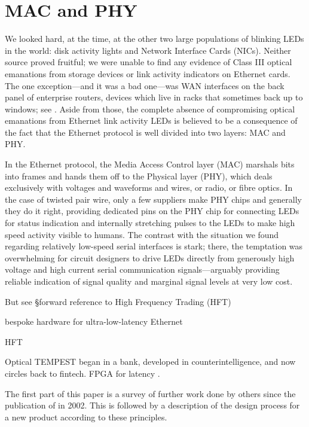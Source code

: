 \documentclass[conference]{IEEEtran}
\begin{document}
\section{MAC and PHY}

We looked hard, at the time, at the other two large populations of blinking
LEDs in the world: disk activity lights and Network Interface Cards (NICs).
Neither source proved fruitful; we were unable to find any evidence of Class
III optical emanations from storage devices or link activity indicators on
Ethernet cards. The one exception---and it was a bad one---was WAN interfaces
on the back panel of enterprise routers, devices which live in racks that
sometimes back up to windows; see \cite[\S 4.3.1]{Loughry2002a}. Aside from
those, the complete absence of compromising optical emanations from Ethernet
link activity LEDs is believed to be a consequence of the fact that the
Ethernet protocol is well divided into two layers: MAC and PHY.

In the Ethernet protocol, the Media Access Control layer (MAC) marshals bits
into frames and hands them off to the Physical layer (PHY), which deals
exclusively with voltages and waveforms and wires, or radio, or fibre optics.
In the case of twisted pair wire, only a few suppliers make PHY chips and
generally they do it right, providing dedicated pins on the PHY chip for
connecting LEDs for status indication and internally stretching pulses to the
LEDs to make high speed activity visible to humans. The contrast with the
situation we found regarding relatively low-speed serial interfaces is stark;
there, the temptation was overwhelming for circuit designers to drive LEDs
directly from generously high voltage and high current serial communication
signals---arguably providing reliable indication of signal quality and
marginal signal levels at very low cost.

But see \S forward reference to High Frequency Trading (HFT)

bespoke hardware for ultra-low-latency Ethernet

HFT

Optical TEMPEST began in a bank, developed in counterintelligence,
and now circles back to fintech. FPGA for latency \cite{Hurd2018a}.

The first part of this paper is a survey of further work done by others since
the publication of \cite{Loughry2002a} in 2002. This is followed by a
description of the design process for a new product according to these
principles.
\end{document}
